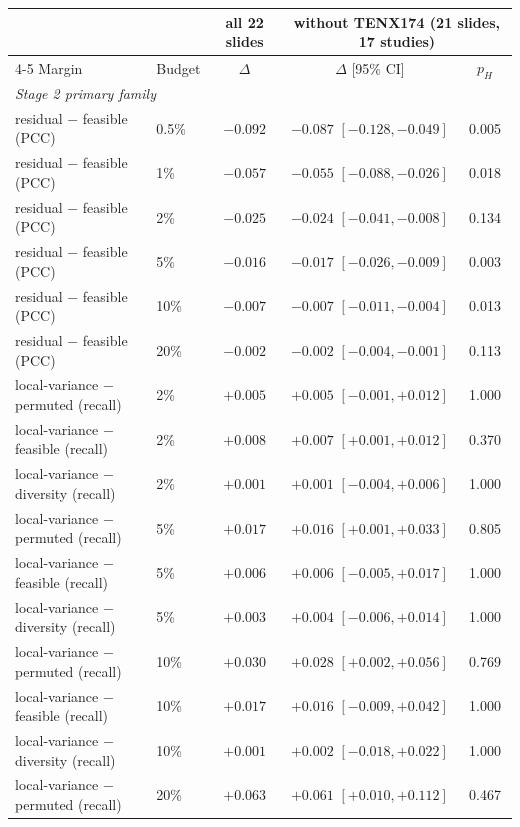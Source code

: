 \begin{tabular}{llccc}
\toprule
 & & all 22 slides & \multicolumn{2}{c}{without TENX174 (21 slides, 17 studies)} \\
\cmidrule(lr){4-5}
Margin & Budget & $\Delta$ & $\Delta$ [95\% CI] & $p_H$ \\
\midrule
\multicolumn{5}{l}{\emph{Stage 2 primary family}} \\
residual $-$ feasible (PCC) & 0.5\% & $-0.092$ & $-0.087$ $[-0.128, -0.049]$ & 0.005 \\
residual $-$ feasible (PCC) & 1\% & $-0.057$ & $-0.055$ $[-0.088, -0.026]$ & 0.018 \\
residual $-$ feasible (PCC) & 2\% & $-0.025$ & $-0.024$ $[-0.041, -0.008]$ & 0.134 \\
residual $-$ feasible (PCC) & 5\% & $-0.016$ & $-0.017$ $[-0.026, -0.009]$ & 0.003 \\
residual $-$ feasible (PCC) & 10\% & $-0.007$ & $-0.007$ $[-0.011, -0.004]$ & 0.013 \\
residual $-$ feasible (PCC) & 20\% & $-0.002$ & $-0.002$ $[-0.004, -0.001]$ & 0.113 \\
local-variance $-$ permuted (recall) & 2\% & ${+}0.005$ & ${+}0.005$ $[-0.001, {+}0.012]$ & 1.000 \\
local-variance $-$ feasible (recall) & 2\% & ${+}0.008$ & ${+}0.007$ $[{+}0.001, {+}0.012]$ & 0.370 \\
local-variance $-$ diversity (recall) & 2\% & ${+}0.001$ & ${+}0.001$ $[-0.004, {+}0.006]$ & 1.000 \\
local-variance $-$ permuted (recall) & 5\% & ${+}0.017$ & ${+}0.016$ $[{+}0.001, {+}0.033]$ & 0.805 \\
local-variance $-$ feasible (recall) & 5\% & ${+}0.006$ & ${+}0.006$ $[-0.005, {+}0.017]$ & 1.000 \\
local-variance $-$ diversity (recall) & 5\% & ${+}0.003$ & ${+}0.004$ $[-0.006, {+}0.014]$ & 1.000 \\
local-variance $-$ permuted (recall) & 10\% & ${+}0.030$ & ${+}0.028$ $[{+}0.002, {+}0.056]$ & 0.769 \\
local-variance $-$ feasible (recall) & 10\% & ${+}0.017$ & ${+}0.016$ $[-0.009, {+}0.042]$ & 1.000 \\
local-variance $-$ diversity (recall) & 10\% & ${+}0.001$ & ${+}0.002$ $[-0.018, {+}0.022]$ & 1.000 \\
local-variance $-$ permuted (recall) & 20\% & ${+}0.063$ & ${+}0.061$ $[{+}0.010, {+}0.112]$ & 0.467 \\

\end{tabular}
